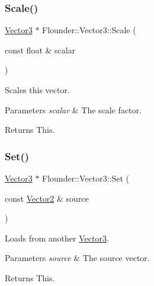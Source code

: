\subsubsection{\texorpdfstring{Scale()}{Scale()}\hspace{0.1cm}{\footnotesize\ttfamily [2/2]}}
{\footnotesize\ttfamily \hyperlink{class_flounder_1_1_vector3}{Vector3} $\ast$ Flounder\+::\+Vector3\+::\+Scale (\begin{DoxyParamCaption}\item[{const float \&}]{scalar }\end{DoxyParamCaption})}



Scales this vector. 


\begin{DoxyParams}{Parameters}
{\em scalar} & The scale factor. \\
\hline
\end{DoxyParams}
\begin{DoxyReturn}{Returns}
This. 
\end{DoxyReturn}
\mbox{\label{class_flounder_1_1_vector3_a39f86aa416fb78da896877379ad74e39}} 
\subsubsection{\texorpdfstring{Set()}{Set()}\hspace{0.1cm}{\footnotesize\ttfamily [1/4]}}
{\footnotesize\ttfamily \hyperlink{class_flounder_1_1_vector3}{Vector3} $\ast$ Flounder\+::\+Vector3\+::\+Set (\begin{DoxyParamCaption}\item[{const \hyperlink{class_flounder_1_1_vector2}{Vector2} \&}]{source }\end{DoxyParamCaption})}



Loads from another \hyperlink{class_flounder_1_1_vector3}{Vector3}. 


\begin{DoxyParams}{Parameters}
{\em source} & The source vector. \\
\hline
\end{DoxyParams}
\begin{DoxyReturn}{Returns}
This. 
\end{DoxyReturn}
\mbox{\label{class_flounder_1_1_vector3_aa87dd594f1e830cd42a260079d7a9ac2}} 
